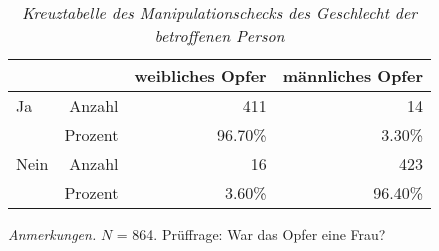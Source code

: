 \begin{table}[htb]
    \caption[Kreuztabelle Manipulationscheck Opfergeschlecht]{\textit {Kreuztabelle des Manipulationschecks des Geschlecht der betroffenen Person}} 
    \label{KT_sex}
    \centering
    \begin{adjustbox}{width=10cm} %
    \small
    \begin{tabular}{lrrr}
      \hline
        &   & weibliches Opfer & männliches Opfer \\
      \hline
    Ja   & Anzahl  & 411      & 14      \\
    & Prozent & 96.70\%  & 3.30\%  \\
    Nein & Anzahl  & 16       & 423     \\
    & Prozent & 3.60\%   & 96.40\% \\
       \hline
    \end{tabular}
    \end{adjustbox}
    
    \begin{tablenotes}
        \item \textit{Anmerkungen.} \( N \) = 864. Prüffrage: War das Opfer eine Frau?
      \end{tablenotes}
    \end{table}


